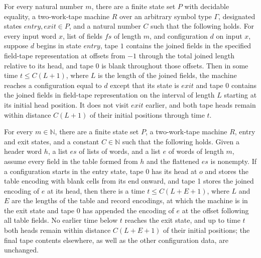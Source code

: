 \begin{theorem}
\label{Turing.rt_fieldsCopy_reverse}
\leanok
{}
For every natural number $m$, there are a finite state set $P$ with decidable equality,
a two-work-tape machine $R$ over an arbitrary symbol type $\Gamma$, designated states
$entry,exit\in P$, and a natural number $C$ such that the following holds. For every
input word $x$, list of fields $fs$ of length $m$, and configuration $d$ on input $x$,
suppose $d$ begins in state $entry$, tape $1$ contains the joined fields in the
specified field-tape representation at offsets from $-1$ through the total joined length
relative to its head, and tape $0$ is blank throughout those offsets. Then in some time
$t\le C(L+1)$, where $L$ is the length of the joined fields, the machine reaches a
configuration equal to $d$ except that its state is $exit$ and tape $0$ contains the
joined fields in field-tape representation on the interval of length $L$ starting at its
initial head position. It does not visit $exit$ earlier, and both tape heads remain
within distance $C(L+1)$ of their initial positions through time $t$.
\end{theorem}

\begin{theorem}
\label{Turing.rt_append_copy}
\leanok
{}
For every $m\in\mathbb{N}$, there are a finite state set $P$, a two-work-tape machine
$R$, entry and exit states, and a constant $C\in\mathbb{N}$ such that the following
holds. Given a header word $h$, a list $es$ of lists of words, and a list $e$ of words
of length $m$, assume every field in the table formed from $h$ and the flattened $es$ is
nonempty. If a configuration starts in the entry state, tape 0 has its head at $o$ and
stores the table encoding with blank cells from its end onward, and tape 1 stores the
joined encoding of $e$ at its head, then there is a time $t\le C(L+E+1)$, where $L$ and
$E$ are the lengths of the table and record encodings, at which the machine is in the
exit state and tape 0 has appended the encoding of $e$ at the offset following all table
fields. No earlier time below $t$ reaches the exit state, and up to time $t$ both heads
remain within distance $C(L+E+1)$ of their initial positions; the final tape contents
elsewhere, as well as the other configuration data, are unchanged.
\end{theorem}

